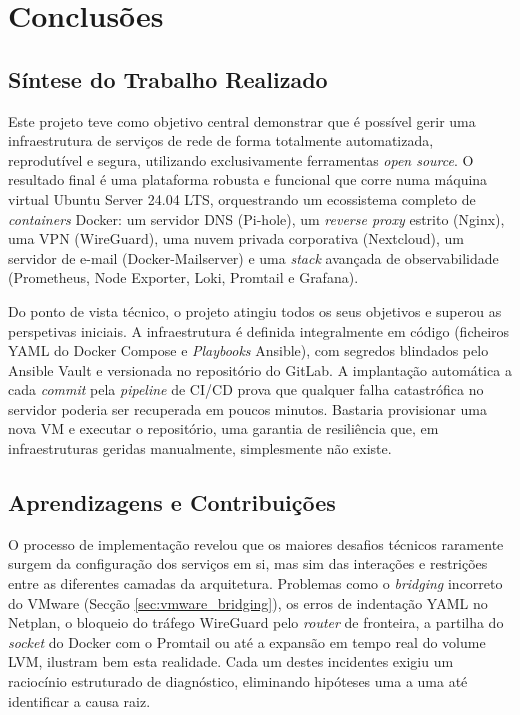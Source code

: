 \chapter{Conclusões}
\label{cap:conclusions}

\section{Síntese do Trabalho Realizado}

Este projeto teve como objetivo central demonstrar que é possível gerir uma infraestrutura de serviços de rede de forma totalmente automatizada, reprodutível e segura, utilizando exclusivamente ferramentas \textit{open source}. O resultado final é uma plataforma robusta e funcional que corre numa máquina virtual Ubuntu Server 24.04 LTS, orquestrando um ecossistema completo de \textit{containers} Docker: um servidor DNS (Pi-hole), um \textit{reverse proxy} estrito (Nginx), uma VPN (WireGuard), uma nuvem privada corporativa (Nextcloud), um servidor de e-mail (Docker-Mailserver) e uma \textit{stack} avançada de observabilidade (Prometheus, Node Exporter, Loki, Promtail e Grafana).

Do ponto de vista técnico, o projeto atingiu todos os seus objetivos e superou as perspetivas iniciais. A infraestrutura é definida integralmente em código (ficheiros YAML do Docker Compose e \textit{Playbooks} Ansible), com segredos blindados pelo Ansible Vault e versionada no repositório do GitLab. A implantação automática a cada \textit{commit} pela \textit{pipeline} de CI/CD prova que qualquer falha catastrófica no servidor poderia ser recuperada em poucos minutos. Bastaria provisionar uma nova VM e executar o repositório, uma garantia de resiliência que, em infraestruturas geridas manualmente, simplesmente não existe.

\section{Aprendizagens e Contribuições}

O processo de implementação revelou que os maiores desafios técnicos raramente surgem da configuração dos serviços em si, mas sim das interações e restrições entre as diferentes camadas da arquitetura. Problemas como o \textit{bridging} incorreto do VMware (Secção \ref{sec:vmware_bridging}), os erros de indentação YAML no Netplan, o bloqueio do tráfego WireGuard pelo \textit{router} de fronteira, a partilha do \textit{socket} do Docker com o Promtail ou até a expansão em tempo real do volume LVM, ilustram bem esta realidade. Cada um destes incidentes exigiu um raciocínio estruturado de diagnóstico, eliminando hipóteses uma a uma até identificar a causa raiz.

